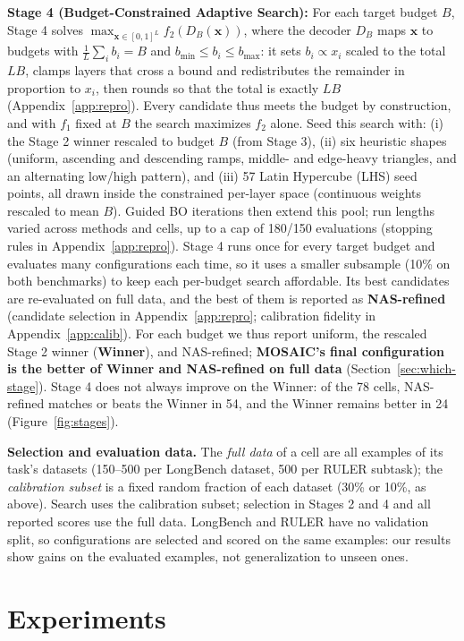 \documentclass[11pt]{article}
\begin{document}
\textbf{Stage 4 (Budget-Constrained Adaptive Search):} For each target budget $B$, Stage 4 solves $\max_{\mathbf{x} \in [0,1]^L} f_2(D_B(\mathbf{x}))$, where the decoder $D_B$ maps $\mathbf{x}$ to budgets with $\frac{1}{L}\sum_i b_i = B$ and $b_{\min} \le b_i \le b_{\max}$: it sets $b_i \propto x_i$ scaled to the total $LB$, clamps layers that cross a bound and redistributes the remainder in proportion to $x_i$, then rounds so that the total is exactly $LB$ (Appendix~\ref{app:repro}). Every candidate thus meets the budget by construction, and with $f_1$ fixed at $B$ the search maximizes $f_2$ alone. Seed this search with: (i) the Stage 2 winner rescaled to budget $B$ (from Stage 3), (ii) six heuristic shapes (uniform, ascending and descending ramps, middle- and edge-heavy triangles, and an alternating low/high pattern), and (iii) 57 Latin Hypercube (LHS) seed points, all drawn inside the constrained per-layer space (continuous weights rescaled to mean $B$). Guided BO iterations then extend this pool; run lengths varied across methods and cells, up to a cap of 180/150 evaluations (stopping rules in Appendix~\ref{app:repro}). Stage 4 runs once for every target budget and evaluates many configurations each time, so it uses a smaller subsample (10\% on both benchmarks) to keep each per-budget search affordable. Its best candidates are re-evaluated on full data, and the best of them is reported as \textbf{NAS-refined} (candidate selection in Appendix~\ref{app:repro}; calibration fidelity in Appendix~\ref{app:calib}). For each budget we thus report uniform, the rescaled Stage 2 winner (\textbf{Winner}), and NAS-refined; \textbf{MOSAIC's final configuration is the better of Winner and NAS-refined on full data} (Section~\ref{sec:which-stage}). Stage 4 does not always improve on the Winner: of the 78 cells, NAS-refined matches or beats the Winner in 54, and the Winner remains better in 24 (Figure~\ref{fig:stages}).

\textbf{Selection and evaluation data.} The \emph{full data} of a cell are all examples of its task's datasets (150--500 per LongBench dataset, 500 per RULER subtask); the \emph{calibration subset} is a fixed random fraction of each dataset (30\% or 10\%, as above). Search uses the calibration subset; selection in Stages 2 and 4 and all reported scores use the full data. LongBench and RULER have no validation split, so configurations are selected and scored on the same examples: our results show gains on the evaluated examples, not generalization to unseen ones.


\section{Experiments}
\end{document}
